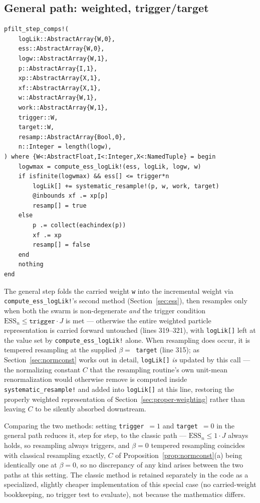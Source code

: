 \documentclass[11pt]{article}
\newcommand{\ESS}{\mathrm{ESS}}
\begin{document}
\subsection{General path: weighted, trigger/target}

\begin{lstlisting}[caption={General filtering step (\texttt{pfilter.jl}, lines 299--324)}]
pfilt_step_comps!(
    logLik::AbstractArray{W,0},
    ess::AbstractArray{W,0},
    logw::AbstractArray{W,1},
    p::AbstractArray{I,1},
    xp::AbstractArray{X,1},
    xf::AbstractArray{X,1},
    w::AbstractArray{W,1},
    work::AbstractArray{W,1},
    trigger::W,
    target::W,
    resamp::AbstractArray{Bool,0},
    n::Integer = length(logw),
) where {W<:AbstractFloat,I<:Integer,X<:NamedTuple} = begin
    logwmax = compute_ess_logLik!(ess, logLik, logw, w)
    if isfinite(logwmax) && ess[] <= trigger*n
        logLik[] += systematic_resample!(p, w, work, target)
        @inbounds xf .= xp[p]
        resamp[] = true
    else
        p .= collect(eachindex(p))
        xf .= xp
        resamp[] = false
    end
    nothing
end
\end{lstlisting}

The general step folds the carried weight \texttt{w} into the incremental
weight via \texttt{compute\_ess\_logLik!}'s second method
(Section~\ref{sec:ess}), then resamples only when both the swarm is
non-degenerate \emph{and} the trigger condition
$\ESS_n\le\texttt{trigger}\cdot J$ is met — otherwise the entire weighted
particle representation is carried forward untouched (lines 319--321), with
\texttt{logLik[]} left at the value set by \texttt{compute\_ess\_logLik!}
alone. When resampling does occur, it is tempered resampling at the supplied
$\beta=$~\texttt{target} (line 315); as Section~\ref{sec:normconst} works out
in detail, \texttt{logLik[]} \emph{is} updated by this call — the
normalizing constant $C$ that the resampling routine's own unit-mean
renormalization would otherwise remove is computed inside
\texttt{systematic\_resample!} and added into \texttt{logLik[]} at this
line, restoring the properly weighted representation of
Section~\ref{sec:proper-weighting} rather than leaving $C$ to be silently
absorbed downstream.

Comparing the two methods: setting \texttt{trigger}~$=1$ and
\texttt{target}~$=0$ in the general path reduces it, step for step, to the
classic path — $\ESS_n\le 1\cdot J$ always holds, so resampling always
triggers, and $\beta=0$ tempered resampling coincides with classical
resampling exactly, $C$ of Proposition~\ref{prop:normconst}(a) being
identically one at $\beta=0$, so no discrepancy of any kind arises between
the two paths at this setting. The classic method is retained separately in
the code as a specialized, slightly cheaper implementation of this special
case (no carried-weight bookkeeping, no trigger test to evaluate), not
because the mathematics differs.
\end{document}
